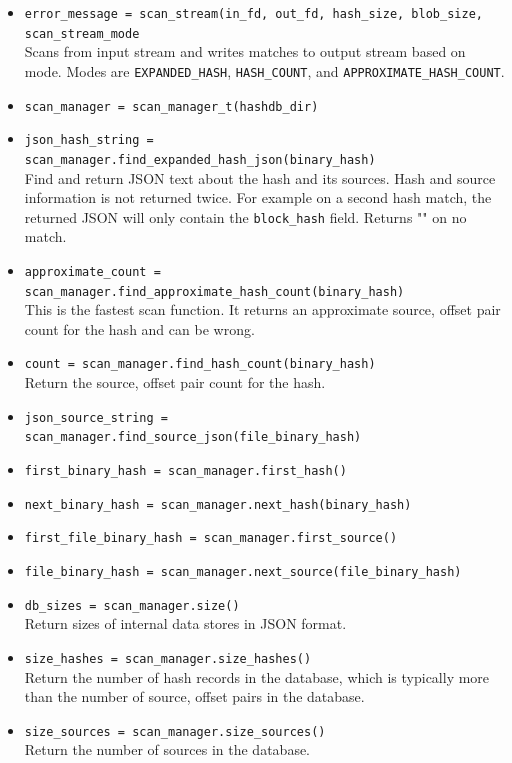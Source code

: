 \documentclass[11pt,fleqn]{article} %
\begin{document}
\begin{itemize}
\item \verb+error_message = scan_stream(in_fd, out_fd, hash_size, blob_size,+\\
\verb+scan_stream_mode+\\
Scans from input stream and writes matches to output stream based on mode.  Modes are \verb+EXPANDED_HASH+, \verb+HASH_COUNT+, and \verb+APPROXIMATE_HASH_COUNT+.
\item \verb+scan_manager = scan_manager_t(hashdb_dir)+
\item \verb+json_hash_string = scan_manager.find_expanded_hash_json(binary_hash)+\\
Find and return JSON text about the hash and its sources. Hash and source information is not returned twice. For example on a second hash match, the returned JSON will only contain the \verb+block_hash+ field. Returns "" on no match.
\item \verb+approximate_count = scan_manager.find_approximate_hash_count(binary_hash)+\\
This is the fastest scan function. It returns an approximate source, offset pair count for the hash and can be wrong.
\item \verb+count = scan_manager.find_hash_count(binary_hash)+\\
Return the source, offset pair count for the hash.
\item \verb+json_source_string = scan_manager.find_source_json(file_binary_hash)+
\item \verb+first_binary_hash = scan_manager.first_hash()+
\item \verb+next_binary_hash = scan_manager.next_hash(binary_hash)+
\item \verb+first_file_binary_hash = scan_manager.first_source()+
\item \verb+file_binary_hash = scan_manager.next_source(file_binary_hash)+
\item \verb+db_sizes = scan_manager.size()+\\
Return sizes of internal data stores in JSON format.
\item \verb+size_hashes = scan_manager.size_hashes()+\\
Return the number of hash records in the database, which is typically more than the number of source, offset pairs in the database.
\item \verb+size_sources = scan_manager.size_sources()+\\
Return the number of sources in the database.
\end{itemize}
\end{document}
